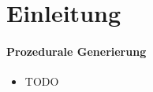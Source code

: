 
\newpage
{}
\section{Einleitung}
\paragraph{Prozedurale Generierung\\}
\begin{itemize}
	\item TODO\\

\end{itemize}

\newpage
{}
\begin{center}
\end{center}
